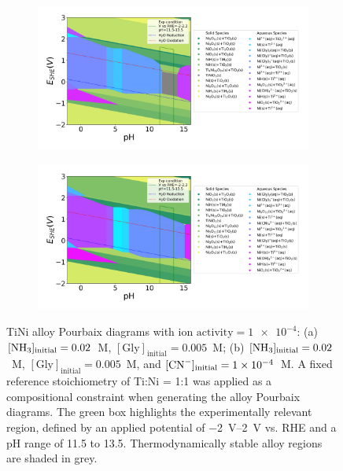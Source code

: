 \documentclass[journal=jacsat,manuscript=article]{achemso}
\begin{document}
\begin{figure}[htbp]
    \centering
    \begin{subfigure}[b]{0.45\textwidth}
        \subcaption{}\label{fig:TiNi_Pourbaix_NH3_Gly}
        \includegraphics[width=\textwidth]
        {Figures/alloy_pourbaix_diagrams/Ti_Ni_alloy_Ti0.5 Ni0.5_NH3=0.02M_Gly=0.005M_CN=0M_activity=1e-04M.png}
        \par\medskip
    \end{subfigure}
    \begin{subfigure}[b]{0.45\textwidth}
        \subcaption{}\label{fig:TiNi_Pourbaix_NH3_Gly_CN}
        \includegraphics[width=\textwidth]{Figures/alloy_pourbaix_diagrams/Ti_Ni_alloy_Ti0.5 Ni0.5_NH3=0.02M_Gly=0.005M_CN=0.0001M_activity=1e-04M.png}
        \par\medskip   
    \end{subfigure}
    \caption{TiNi alloy Pourbaix diagrams with $\text{ion activity} = \num{1e-4}$: (a) $[\ce{NH3}]_\text{initial} = 0.02$~M, $[\text{Gly}]_\text{initial} = 0.005$~M; (b) $[\ce{NH3}]_\text{initial} = 0.02$~M, $[\text{Gly}]_\text{initial} = 0.005$~M, and $[\ce{CN^-}]_\text{initial} = \num{1e-4}$~M. A fixed reference stoichiometry of Ti:Ni = 1:1 was applied as a compositional constraint when generating the alloy Pourbaix diagrams. The green box highlights the experimentally relevant region, defined by an applied potential of \SIrange{-2}{2}{V} vs. RHE and a pH range of 11.5 to 13.5. Thermodynamically stable alloy regions are shaded in grey.}
    \label{fig:TiNi_alloy_Pourbaix}
\end{figure}
\end{document}
